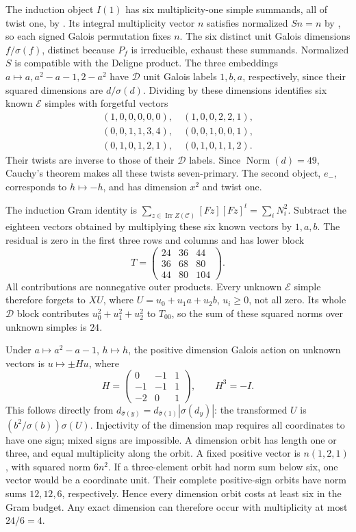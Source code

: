 The induction object $I(1)$ has six multiplicity-one simple summands,
all of twist one, by \cite[Theorems~2.5 and~2.13]{Ostrik3}.
Its integral multiplicity vector $n$ satisfies normalized $Sn=n$
by \cite[Proposition~2.8]{Ostrik3}, so each signed Galois permutation
fixes $n$. The six distinct unit Galois dimensions $f/\sigma(f)$,
distinct because $P_f$ is irreducible, exhaust these summands.
Normalized $S$ is compatible with the Deligne product. The three
embeddings $a\mapsto a,a^2-a-1,2-a^2$ have $\mathcal D$ unit
Galois labels $1,b,a$, respectively, since their squared dimensions
are $d/\sigma(d)$. Dividing by these dimensions identifies six known
$\mathcal E$ simples with forgetful vectors
\[
\begin{gathered}
 (1,0,0,0,0,0),\quad(1,0,0,2,2,1),\\
 (0,0,1,1,3,4),\quad(0,0,1,0,0,1),\\
 (0,1,0,1,2,1),\quad(0,1,0,1,1,2).
\end{gathered}
\]
Their twists are inverse to those of their $\mathcal D$ labels.
Since $\operatorname{Norm}(d)=49$, Cauchy's theorem
\cite[Theorem~3.9]{BNRW} makes all these twists seven-primary.
The second object, $e_-$, corresponds to $h\mapsto-h$, and has
dimension $x^2$ and twist one.

The induction Gram identity is
$\sum_{z\in\operatorname{Irr}Z(\mathcal C)}[Fz][Fz]^t=\sum_iN_i^2$.
Subtract the eighteen vectors obtained by multiplying these six known
vectors by $1,a,b$. The residual is zero in the first three rows and
columns and has lower block
\[
 T=\begin{pmatrix}24&36&44\\36&68&80\\44&80&104\end{pmatrix}.
\]
All contributions are nonnegative outer products. Every unknown
$\mathcal E$ simple therefore forgets to $XU$, where
$U=u_0+u_1a+u_2b$, $u_i\ge0$, not all zero.
Its whole $\mathcal D$ block contributes $u_0^2+u_1^2+u_2^2$ to
$T_{00}$, so the sum of these squared norms over unknown simples is
$24$.

Under $a\mapsto a^2-a-1$, $h\mapsto h$, the positive dimension
Galois action on unknown vectors is $u\mapsto\pm Hu$, where
\[
 H=\begin{pmatrix}0&-1&1\\-1&-1&1\\-2&0&1\end{pmatrix},\qquad H^3=-I.
\]
This follows directly from
$d_{\widehat\sigma(y)}=d_{\widehat\sigma(1)}|\sigma(d_y)|$:
the transformed $U$ is $(b^2/\sigma(b))\sigma(U)$.
Injectivity of the dimension map requires all coordinates to have
one sign; mixed signs are impossible. A dimension orbit has length one
or three, and equal multiplicity along the orbit.
A fixed positive vector is $n(1,2,1)$, with squared norm $6n^2$.
If a three-element orbit had norm sum below six, one vector would be
a coordinate unit. Their complete positive-sign orbits have norm sums
$12,12,6$, respectively. Hence every dimension orbit costs at least
six in the Gram budget. Any exact dimension can therefore occur with
multiplicity at most $24/6=4$.

